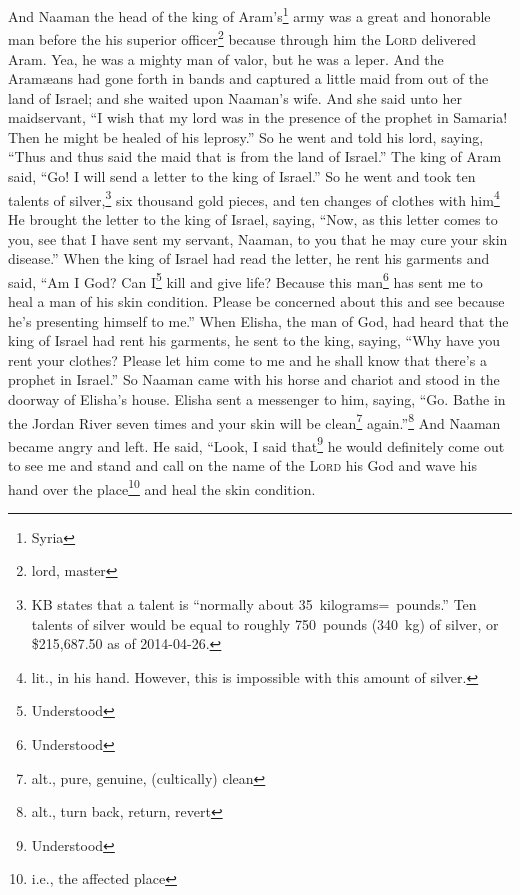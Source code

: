 
\begin{inparaenum}
     And Naaman the head of the king of Aram's\footnote{Syria} army was a great and honorable man before the his superior officer\footnote{lord, master} because through him the \textsc{Lord} delivered Aram. Yea, he was a mighty man of valor, but he was a leper.%
     And the Aram\ae{}ans had gone forth in bands and captured a little maid from out of the land of Israel; and she waited upon Naaman's wife.%
     And she said unto her maidservant, ``I wish that my lord was in the presence of the prophet in Samaria! Then he might be healed of his leprosy.''%
     So he went and told his lord, saying, ``Thus and thus said the maid that is from the land of Israel.''%
     The king of Aram said, ``Go! I will send a letter to the king of Israel.'' So he went and took ten talents of silver,\footnote{KB states that a talent is ``normally about 35~kilograms\thinspace=~pounds.'' Ten talents of silver would be equal to roughly 750~pounds (340~kg) of silver, or \$215,687.50 as of 2014-04-26.} six thousand gold pieces, and ten changes of clothes with him\footnote{lit., in his hand. However, this is impossible with this amount of silver.}%
     He brought the letter to the king of Israel, saying, ``Now, as this letter comes to you, see that I have sent my servant, Naaman, to you that he may cure your skin disease.''%
     When the king of Israel had read the letter, he rent his garments and said, ``Am I God? Can I\footnote{Understood} kill and give life? Because this man\footnote{Understood} has sent me to heal a man of his skin condition. Please be concerned about this and see because he's presenting himself to me.''%
     When Elisha, the man of God, had heard that the king of Israel had rent his garments, he sent to the king, saying, ``Why have you rent your clothes? Please let him come to me and he shall know that there's a prophet in Israel.''%
     So Naaman came with his horse and chariot and stood in the doorway of Elisha's house.%
     Elisha sent a messenger to him, saying, ``Go. Bathe in the Jordan River seven times and your skin will be clean\footnote{alt., pure, genuine, (cultically) clean} again.''\footnote{alt., turn back, return, revert}%
     And Naaman became angry and left. He said, ``Look, I said that\footnote{Understood} he would definitely come out to see me and stand and call on the name of the \textsc{Lord} his God and wave his hand over the place\footnote{i.e., the affected place} and heal the skin condition.%

\end{inparaenum}
